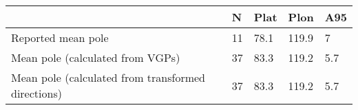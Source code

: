 \begin{tabular}{lllll}
\toprule
{} &   N &  Plat &   Plon &  A95 \\
\midrule
Reported mean pole                                 &  11 &  78.1 &  119.9 &    7 \\
Mean pole (calculated from VGPs)                   &  37 &  83.3 &  119.2 &  5.7 \\
Mean pole (calculated from transformed directions) &  37 &  83.3 &  119.2 &  5.7 \\
\bottomrule
\end{tabular}
